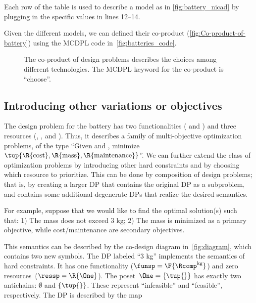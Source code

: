 Each row of the table is used to describe a model as in \cref{fig:battery_nicad} by plugging in the specific values in lines 12--14.

Given the different models, we can defined their co-product (\cref{fig:Co-product-of-battery}) using the MCDPL code in~\cref{fig:batteries_code}.

\begin{figure}[h]

	\caption{
		The co-product of design problems describes the choices among different technologies.
		The MCDPL keyword for the co-product is ``choose''.
	}
	\label{fig:batteriesbig}
\end{figure}

\subsection{Introducing other variations or objectives}

The design problem for the battery has two functionalities ( and ) and three resources (, , and ).
Thus, it describes a family of multi-objective optimization problems, of the type ``Given  and , minimize $\tup{ \R{\text{cost}},\R{\text{mass}},\R{\text{maintenance}}} $''.
We can further extend the class of optimization problems by introducing other hard constraints and by choosing which resource to prioritize.
This can be done by composition of design problems; that is, by creating a larger DP that contains the original DP as a subproblem, and contains some additional degenerate DPs that realize the desired semantics.

For example, suppose that we would like to find the optimal solution(s) such that: 1) The mass does not exceed 3 kg; 2) The mass is minimized as a primary objective, while cost/maintenance are secondary objectives.

This semantics can be described by the co-design diagram in~\cref{fig:diagram}, which contains two new symbols.
The DP labeled ``3 kg'' implements the semantics of hard constraints.
It has one functionality ($\funsp=\F{\Rcomp^{\text{kg}}}$) and zero resources~($\ressp=\R{\One}$).
The poset~$\One=\{\tup{ } \}$ has exactly two antichains: $\emptyset$ and $\{\tup{ } \}$.
These represent ``infeasible'' and ``feasible'', respectively.
The DP is described by the map

